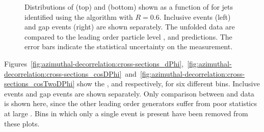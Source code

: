 \begin{figure}[htpb]
{    \label{fig:azimuthal-decorrelation:cosTwo_gap}}
  \caption{Distributions of \meanCosDPhi (top) and \meanCosTwoDPhi (bottom) shown as a function
           of \DeltaY for jets identified using the \akt algorithm with $R=0.6$.
           Inclusive events (left) and gap events (right) are shown separately.
           The unfolded data are compared to the leading order particle level , \Herwigpp and \Alpgen predictions.
           The error bars indicate the statistical uncertainty on the measurement.}
  \label{fig:azimuthal-decorrelation:cosDeltaPhi}
\end{figure}

Figures~\ref{fig:azimuthal-decorrelation:cross-sections_dPhi},~\ref{fig:azimuthal-decorrelation:cross-sections_cosDPhi}~and~\ref{fig:azimuthal-decorrelation:cross-sections_cosTwoDPhi}
show the \DeltaPhi, \cosDPhi and \cosTwoDPhi {} respectively, for six different
\DeltaY bins. Inclusive events and gap events are shown separately. Only
comparison between \Pythia and data is shown here, since the other leading
order \MC generators suffer from poor statistics at large \DeltaY. Bins in which
only a single event is present have been removed from these plots.

